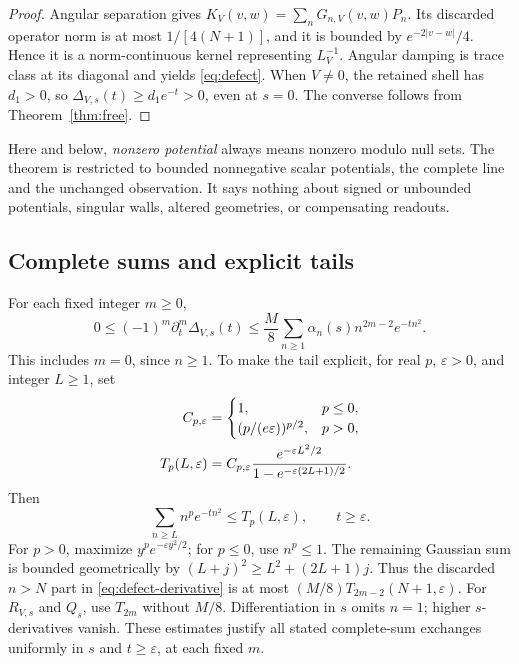 \documentclass[11pt,letterpaper]{article}
\numberwithin{equation}{section}
\theoremstyle{remark}
\begin{document}
\begin{proof}
Angular separation gives
\(K_V(v,w)=\sum_nG_{n,V}(v,w)P_n\).
Its discarded operator norm is at most \(1/[4(N+1)]\), and it
is bounded by \(e^{-2|v-w|}/4\). Hence it is a norm-continuous
kernel representing \(L_V^{-1}\). Angular damping is trace class
at its diagonal and yields \eqref{eq:defect}.
When \(V\ne0\), the retained shell has \(d_1>0\), so
\(\Delta_{V,s}(t)\ge d_1e^{-t}>0\), even at \(s=0\).
The converse follows from Theorem~\ref{thm:free}.
\end{proof}

Here and below, \emph{nonzero potential} always means nonzero modulo
null sets. The theorem is restricted to bounded nonnegative scalar
potentials, the complete line and the unchanged observation.
It says nothing about signed or unbounded potentials, singular
walls, altered geometries, or compensating readouts.

\subsection{Complete sums and explicit tails}

For each fixed integer \(m\ge0\),
\begin{equation}
 0\le(-1)^m\partial_t^m\Delta_{V,s}(t)
 \le\frac M8\sum_{n\ge1}\alpha_n(s)n^{2m-2}e^{-tn^2}.
 \label{eq:defect-derivative}
\end{equation}
This includes \(m=0\), since \(n\ge1\). To make the tail explicit,
for real \(p\), \(\varepsilon>0\), and integer \(L\ge1\), set
\begin{align}
 C_{p,\varepsilon}&=
 \begin{cases}1,&p\le0,\\ (p/(e\varepsilon))^{p/2},&p>0,\end{cases}\notag\\
 T_p(L,\varepsilon)&=
 C_{p,\varepsilon}\frac{e^{-\varepsilon L^2/2}}
 {1-e^{-\varepsilon(2L+1)/2}}. \label{eq:gaussian-tail}
\end{align}
Then
\begin{equation}
 \sum_{n\ge L}n^pe^{-tn^2}\le T_p(L,\varepsilon),\qquad
 t\ge\varepsilon.
 \label{eq:tail-bound}
\end{equation}
For \(p>0\), maximize \(y^pe^{-\varepsilon y^2/2}\);
for \(p\le0\), use \(n^p\le1\).
The remaining Gaussian sum is bounded geometrically by
\((L+j)^2\ge L^2+(2L+1)j\).
Thus the discarded \(n>N\) part in
\eqref{eq:defect-derivative} is at most
\((M/8)T_{2m-2}(N+1,\varepsilon)\).
For \(R_{V,s}\) and \(Q_s\), use \(T_{2m}\) without \(M/8\).
Differentiation in \(s\) omits \(n=1\); higher \(s\)-derivatives vanish.
These estimates justify all stated complete-sum exchanges uniformly
in \(s\) and \(t\ge\varepsilon\), at each fixed \(m\).
\end{document}

